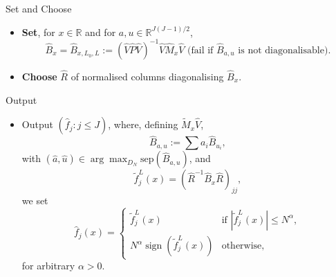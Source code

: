 \documentclass[10pt, aspectratio=169]{beamer}
\begin{document}
\begin{frame}
    \begin{mytheorembox}{Set and Choose}
        \begin{itemize}[label=\scalebox{0.5}{$\bullet$}]
    
        \item \textbf{Set}, for $x \in \mathbb{R}$ and for $a, u \in \mathbb{R}^{J(J-1)/2}$,
        \[
        \hat{B}_x = \hat{B}_{x, L_0, L} := (\hat{V} \hat{P} \hat{V})^{-1} \hat{V} \hat{M}_x \hat{V} \text{ (fail if } \hat{B}_{a, u} \text{ is not diagonalisable)}.
        \]
    
        \item \textbf{Choose} $\hat{R}$ of normalised columns diagonalising $\hat{B}_x$.
    \end{itemize}
        
    \end{mytheorembox}
\end{frame}


\begin{frame}
    \begin{mytheorembox}{Output}
    \begin{itemize}[label=\scalebox{0.5}{$\bullet$}]
        \item Output $(\hat{f}_j : j \leq J)$, where, defining $\tilde{M}_x \hat{V}$,
        \[
        \hat{B}_{a, u} := \sum a_i \hat{B}_{u_i},
        \]
        with $(\hat{a}, \hat{u}) \in \arg\max_{D_N} \text{sep}(\hat{B}_{a, u})$, and
        \[
        \tilde{f}^L_j(x) = (\hat{R}^{-1} \hat{B}_x \hat{R})_{jj},
        \]
        we set
        \[
        \hat{f}_j(x) =
        \begin{cases}
        \tilde{f}^L_j(x) & \text{if } |\tilde{f}^L_j(x)| \leq N^\alpha, \\
        N^\alpha \operatorname{sign}(\tilde{f}^L_j(x)) & \text{otherwise},
        \end{cases}
        \]
        for arbitrary $\alpha > 0$.
    \end{itemize}
        
    \end{mytheorembox}
\end{frame}
\end{document}
